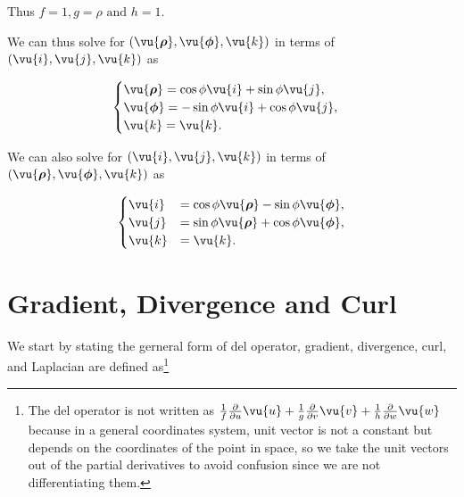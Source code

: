 \documentclass[english,a4paper,12pt]{report}
\begin{document}
Thus \(f = 1, g = \rho  \text { and }  h = 1\). 

We can thus solve for \((\vu{\boldsymbol{\rho } }, \vu{\boldsymbol{\phi } }, \vu{k} )\) in terms of \((\vu{i} ,\vu{j} ,\vu{k} )\) as

\begin{equation}
    \begin{cases} 
        \vu{\boldsymbol{\rho } } = \cos \phi \vu{i} + \sin \phi \vu{j}, \\
        \vu{\boldsymbol{\phi } } = -\sin \phi \vu{i} + \cos \phi \vu{j}, \\
        \vu{k} = \vu{k}.
        \end{cases}
\end{equation}



We can also solve for \((\vu{i} , \vu{j}, \vu{k} )\) in terms of \((\vu{\boldsymbol{\rho } }, \vu{\boldsymbol{\phi } }, \vu{k} )\) as  

\begin{equation}
    \begin{cases}
        \vu{i} &= \cos \phi  \vu{\boldsymbol{\rho } } - \sin \phi \vu{\boldsymbol{\phi } }, \\
        \vu{j} &= \sin \phi \vu{\boldsymbol{\rho } } + \cos \phi \vu{\boldsymbol{\phi } }, \\
        \vu{k} &= \vu{k}. 
        \end{cases}
\end{equation}












\section{Gradient, Divergence and Curl} 

We start by stating the gerneral form of del operator, gradient, divergence, curl, and Laplacian are defined as\footnote{The del operator is not written as \(\frac{1}{f} \frac{\partial}{\partial u}\vu{u}  + \frac{1}{g} \frac{\partial}{\partial v}\vu{v} + \frac{1}{h} \frac{\partial}{\partial w}\vu{w}\) because in a general coordinates system, unit vector is not a constant but depends on the coordinates of the point in space, so we take the unit vectors out of the partial derivatives to avoid confusion since we are not differentiating them.}
\end{document}
